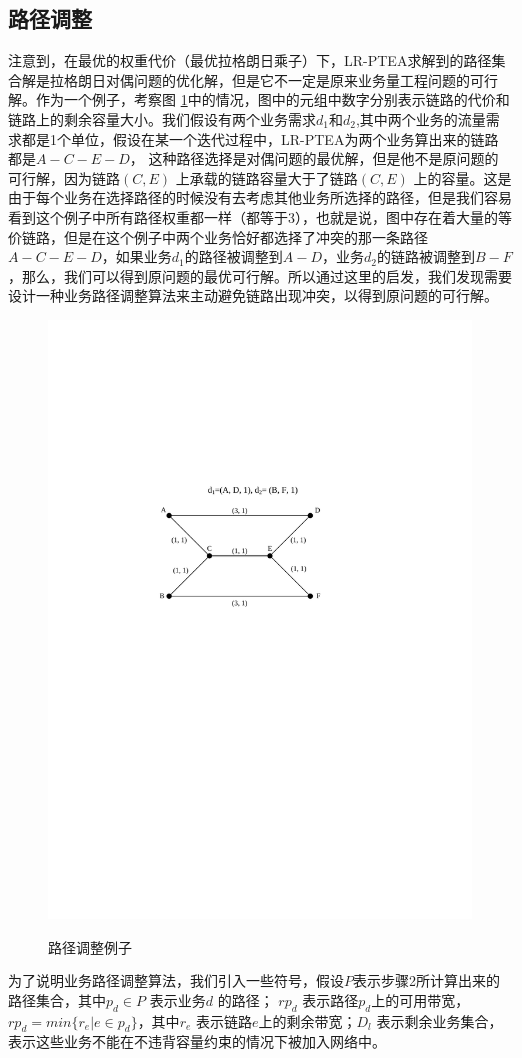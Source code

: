 \subsection{路径调整}
注意到，在最优的权重代价（最优拉格朗日乘子）下，LR-PTEA求解到的路径集合解是拉格朗日对偶问题的优化解，但是它不一定是原来业务量工程问题的可行解。作为一个例子，考察图 \ref{ppt}中的情况，图中的元组中数字分别表示链路的代价和链路上的剩余容量大小。我们假设有两个业务需求$d_1$和$d_2$,其中两个业务的流量需求都是1个单位，假设在某一个迭代过程中，LR-PTEA为两个业务算出来的链路都是$A-C-E-D$， 这种路径选择是对偶问题的最优解，但是他不是原问题的可行解，因为链路$(C,E)$ 上承载的链路容量大于了链路$(C,E)$ 上的容量。这是由于每个业务在选择路径的时候没有去考虑其他业务所选择的路径，但是我们容易看到这个例子中所有路径权重都一样（都等于3），也就是说，图中存在着大量的等价链路，但是在这个例子中两个业务恰好都选择了冲突的那一条路径$A-C-E-D$，如果业务$d_1$的路径被调整到$A-D$，业务$d_2$的链路被调整到$B-F$，那么，我们可以得到原问题的最优可行解。所以通过这里的启发，我们发现需要设计一种业务路径调整算法来主动避免链路出现冲突，以得到原问题的可行解。
\begin{figure}
\setlength{\abovecaptionskip}{-0.5cm}
\begin{center}
{\includegraphics[width=0.4 \textwidth]{figures/PathAdj.pdf}}
\end{center}
\caption{{\footnotesize{路径调整例子}}}
\label{ppt}
\end{figure}

为了说明业务路径调整算法，我们引入一些符号，假设$P$表示步骤2所计算出来的路径集合，其中$p_d\in P$ 表示业务$d$ 的路径； $rp_{d}$ 表示路径$p_d$上的可用带宽，$rp_{d} = min\{r_e | e\in p_d\}$，其中$r_e$ 表示链路$e$上的剩余带宽；$D_l$ 表示剩余业务集合，表示这些业务不能在不违背容量约束的情况下被加入网络中。

